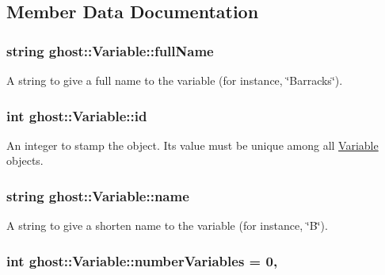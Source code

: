 \subsection{Member Data Documentation}
\hypertarget{classghost_1_1Variable_a87dc1fa73726f887a7ecbd5b9bfa7cab}{
\subsubsection[{full\-Name}]{\setlength{\rightskip}{0pt plus 5cm}string ghost\-::\-Variable\-::full\-Name\hspace{0.3cm}{\ttfamily [protected]}}}\label{classghost_1_1Variable_a87dc1fa73726f887a7ecbd5b9bfa7cab}


A string to give a full name to the variable (for instance, \char`\"{}\-Barracks\char`\"{}). 

\hypertarget{classghost_1_1Variable_a3b1cd0e87cecbb58e115a9000be26f28}{
\subsubsection[{id}]{\setlength{\rightskip}{0pt plus 5cm}int ghost\-::\-Variable\-::id\hspace{0.3cm}{\ttfamily [protected]}}}\label{classghost_1_1Variable_a3b1cd0e87cecbb58e115a9000be26f28}


An integer to stamp the object. Its value must be unique among all \hyperlink{classghost_1_1Variable}{Variable} objects. 

\hypertarget{classghost_1_1Variable_a05cf4a4cd3a5c033028e0b0f11d1dafd}{
\subsubsection[{name}]{\setlength{\rightskip}{0pt plus 5cm}string ghost\-::\-Variable\-::name\hspace{0.3cm}{\ttfamily [protected]}}}\label{classghost_1_1Variable_a05cf4a4cd3a5c033028e0b0f11d1dafd}


A string to give a shorten name to the variable (for instance, \char`\"{}\-B\char`\"{}). 

\hypertarget{classghost_1_1Variable_a6c9862568c3f951afc4ef8dc75b874cf}{
\subsubsection[{number\-Variables}]{\setlength{\rightskip}{0pt plus 5cm}int ghost\-::\-Variable\-::number\-Variables = 0\hspace{0.3cm}{\ttfamily [static]}, {\ttfamily [private]}}}\label{classghost_1_1Variable_a6c9862568c3f951afc4ef8dc75b874cf}


